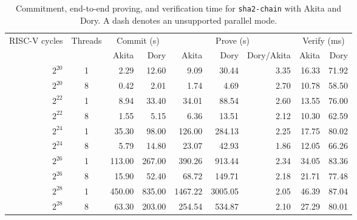\begin{table}[H]
\centering
\caption[Jolt timing with Akita and Dory]{Commitment, end-to-end proving, and
verification time for \texttt{sha2-chain} with Akita and Dory.  A dash
denotes an unsupported parallel mode.}
\label{tab:eval-jolt-time}
\scriptsize
\setlength{\tabcolsep}{3.5pt}
\begin{tabular}{@{}rcrrrrrrr@{}}
\toprule
RISC-V cycles & Threads & \multicolumn{2}{c}{Commit (s)}
& \multicolumn{3}{c}{Prove (s)} & \multicolumn{2}{c}{Verify (ms)} \\
\cmidrule(lr){3-4}\cmidrule(lr){5-7}\cmidrule(lr){8-9}
& & Akita & Dory & Akita & Dory & Dory/Akita & Akita & Dory \\
\midrule
$2^{20}$ & 1 & 2.29 & 12.60 & 9.09 & 30.44 & 3.35 & 16.33 & 71.92 \\
$2^{20}$ & 8 & 0.42 & 2.01 & 1.74 & 4.69 & 2.70 & 10.78 & 58.50 \\
\addlinespace
$2^{22}$ & 1 & 8.94 & 33.40 & 34.01 & 88.54 & 2.60 & 13.55 & 76.00 \\
$2^{22}$ & 8 & 1.55 & 5.15 & 6.36 & 13.51 & 2.12 & 10.30 & 62.59 \\
\addlinespace
$2^{24}$ & 1 & 35.30 & 98.00 & 126.00 & 284.13 & 2.25 & 17.75 & 80.02 \\
$2^{24}$ & 8 & 5.79 & 14.80 & 23.07 & 42.93 & 1.86 & 12.05 & 66.26 \\
\addlinespace
$2^{26}$ & 1 & 113.00 & 267.00 & 390.26 & 913.44 & 2.34 & 34.05 & 83.36 \\
$2^{26}$ & 8 & 15.90 & 52.40 & 68.72 & 149.71 & 2.18 & 21.71 & 77.48 \\
\addlinespace
$2^{28}$ & 1 & 450.00 & 835.00 & 1467.22 & 3005.05 & 2.05 & 46.39 & 87.04 \\
$2^{28}$ & 8 & 63.30 & 203.00 & 254.54 & 534.87 & 2.10 & 27.29 & 80.01 \\
\bottomrule
\end{tabular}
\end{table}

